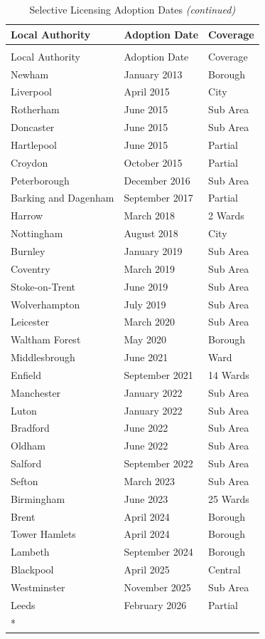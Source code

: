 
\begin{longtable}[t]{lll}
\caption{\label{tab:adoption}Selective Licensing Adoption Dates}\\
\toprule
Local Authority & Adoption Date & Coverage\\
\midrule
\endfirsthead
\caption[]{Selective Licensing Adoption Dates \textit{(continued)}}\\
\toprule
Local Authority & Adoption Date & Coverage\\
\midrule
\endhead

\endfoot
\bottomrule
\endlastfoot
Newham & January 2013 & Borough\\
Liverpool & April 2015 & City\\
Rotherham & June 2015 & Sub Area\\
Doncaster & June 2015 & Sub Area\\
Hartlepool & June 2015 & Partial\\
\addlinespace
Croydon & October 2015 & Partial\\
Peterborough & December 2016 & Sub Area\\
Barking and Dagenham & September 2017 & Partial\\
Harrow & March 2018 & 2 Wards\\
Nottingham & August 2018 & City\\
\addlinespace
Burnley & January 2019 & Sub Area\\
Coventry & March 2019 & Sub Area\\
Stoke-on-Trent & June 2019 & Sub Area\\
Wolverhampton & July 2019 & Sub Area\\
Leicester & March 2020 & Sub Area\\
\addlinespace
Waltham Forest & May 2020 & Borough\\
Middlesbrough & June 2021 & Ward\\
Enfield & September 2021 & 14 Wards\\
Manchester & January 2022 & Sub Area\\
Luton & January 2022 & Sub Area\\
\addlinespace
Bradford & June 2022 & Sub Area\\
Oldham & June 2022 & Sub Area\\
Salford & September 2022 & Sub Area\\
Sefton & March 2023 & Sub Area\\
Birmingham & June 2023 & 25 Wards\\
\addlinespace
Brent & April 2024 & Borough\\
Tower Hamlets & April 2024 & Borough\\
Lambeth & September 2024 & Borough\\
Blackpool & April 2025 & Central\\
Westminster & November 2025 & Sub Area\\
\addlinespace
Leeds & February 2026 & Partial\\*
\end{longtable}
